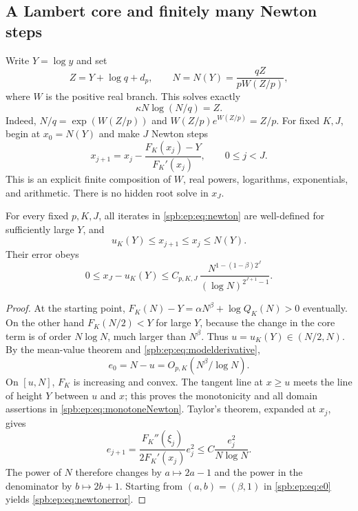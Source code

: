 \subsection{A Lambert core and finitely many Newton steps}
Write $Y=\log y$ and set
\begin{equation}\label{spb:ep:eq:Lambertcore}
 Z=Y+\log q+d_p,\qquad
 N=N(Y)=\frac{qZ}{pW(Z/p)},
\end{equation}
where $W$ is the positive real branch.
This solves exactly
\begin{equation}\label{spb:ep:eq:coreeq}
 \kappa N\log(N/q)=Z.
\end{equation}
Indeed, $N/q=\exp(W(Z/p))$ and $W(Z/p)e^{W(Z/p)}=Z/p$.
For fixed $K,J$, begin at $x_0=N(Y)$ and make $J$ Newton steps
\begin{equation}\label{spb:ep:eq:newton}
 x_{j+1}=x_j-\frac{F_K(x_j)-Y}{F_K'(x_j)},\qquad 0\le j<J.
\end{equation}
This is an explicit finite composition of $W$, real powers, logarithms,
exponentials, and arithmetic. There is no hidden root solve in $x_J$.

\begin{theorem}\label{spb:ep:thm:newton}
For every fixed $p,K,J$, all iterates in \eqref{spb:ep:eq:newton} are well-defined
for sufficiently large $Y$, and
\begin{equation}\label{spb:ep:eq:monotoneNewton}
 u_K(Y)\le x_{j+1}\le x_j\le N(Y).
\end{equation}
Their error obeys
\begin{equation}\label{spb:ep:eq:newtonerror}
 0\le x_J-u_K(Y)
   \le C_{p,K,J}\,
       \frac{N^{1-(1-\beta)2^J}}{(\log N)^{2^{J+1}-1}}.
\end{equation}
\end{theorem}
\begin{proof}
At the starting point,
$F_K(N)-Y=\alpha N^\beta+\log Q_K(N)>0$ eventually.
On the other hand $F_K(N/2)<Y$ for large $Y$, because the change in the
core term is of order $N\log N$, much larger than $N^\beta$.
Thus $u=u_K(Y)\in(N/2,N)$.
By the mean-value theorem and \eqref{spb:ep:eq:modelderivative},
\begin{equation}\label{spb:ep:eq:e0}
 e_0=N-u=O_{p,K}(N^\beta/\log N).
\end{equation}
On $[u,N]$, $F_K$ is increasing and convex. The tangent line at $x\ge u$
meets the line of height $Y$ between $u$ and $x$; this proves the
monotonicity and all domain assertions in \eqref{spb:ep:eq:monotoneNewton}.
Taylor's theorem, expanded at $x_j$, gives
\[
 e_{j+1}=\frac{F_K''(\xi_j)}{2F_K'(x_j)}e_j^2
                \le C\frac{e_j^2}{N\log N}.
\]
The power of $N$ therefore changes by $a\mapsto2a-1$ and the power in
the denominator by $b\mapsto2b+1$. Starting from $(a,b)=(\beta,1)$ in
\eqref{spb:ep:eq:e0} yields \eqref{spb:ep:eq:newtonerror}.
\end{proof}

